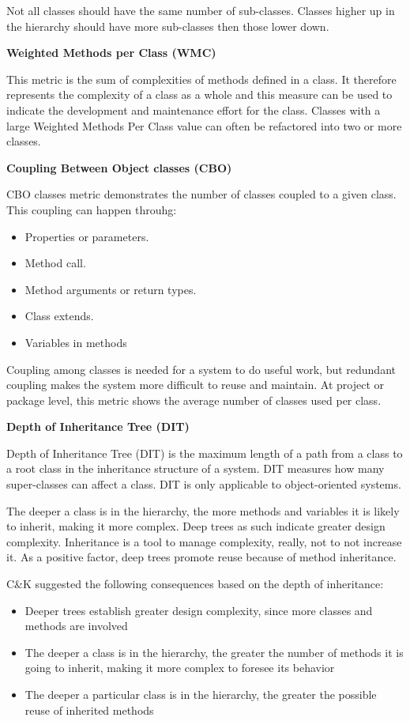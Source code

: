 Not all classes should have the same number of sub-classes. Classes higher up in the hierarchy should have more sub-classes then those lower down.


\textbf{Weighted Methods per Class (WMC)}

This metric is the sum of complexities of methods defined in a class. It therefore represents the
complexity of a class as a whole and this measure can be used to indicate the development and
maintenance effort for the class. Classes with a large Weighted Methods Per Class value can often be refactored into two or more classes.

\textbf{Coupling Between Object classes (CBO)}

CBO classes metric demonstrates the number of classes coupled to a given class. This coupling can happen throuhg:
\begin{itemize}
	\item Properties or parameters. 
	\item Method call. 
	\item Method arguments or return types.
	\item Class extends.
	\item Variables in methods
\end{itemize}

Coupling among classes is needed for a system to do useful work, but redundant coupling makes the system more difficult to reuse and maintain. At project or package level, this metric shows the average number of classes used per class.

\textbf{Depth of Inheritance Tree (DIT)}

Depth of Inheritance Tree (DIT) is the maximum length of a path from a class to a root class in the inheritance structure of a system. DIT measures how many super-classes can affect a class. DIT is only applicable to object-oriented systems.

The deeper a class is in the hierarchy, the more methods and variables it is likely to inherit, making it more complex. Deep trees as such indicate greater design complexity. Inheritance is a tool to manage complexity, really, not to not increase it. As a positive factor, deep trees promote reuse because of method inheritance.

C\&K suggested the following consequences based on the depth of inheritance:
\begin{itemize}
	\item Deeper trees establish greater design complexity, since more classes and methods are involved
	\item The deeper a class is in the hierarchy, the greater the number of methods it is going to inherit, making it more complex to foresee its behavior
	\item The deeper a particular class is in the hierarchy, the greater the possible reuse of inherited methods 
\end{itemize}

